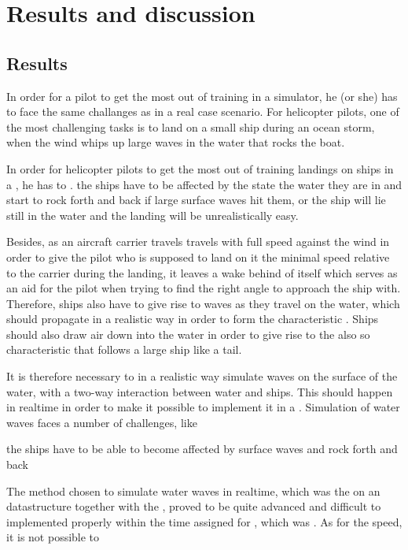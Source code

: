 \part{Results and discussion}

\chapter{Results}

In order for a pilot to get the most out of training in a simulator, he (or she) has to face the same challanges as in a real case scenario. For helicopter pilots, one of the most challenging tasks is to land on a small ship during an ocean storm, when the wind whips up large waves in the water that rocks the boat.

In order for helicopter pilots to get the most out of training landings on ships in a , he has to . the ships have to be affected by the state the water they are in and start to rock forth and back if large surface waves hit them, or the ship will lie still in the water and the landing will be unrealistically easy.

Besides, as an aircraft carrier travels travels with full speed against the wind in order to give the pilot who is supposed to land on it the minimal speed relative to the carrier during the landing, it leaves a wake behind of itself which serves as an aid for the pilot when trying to find the right angle to approach the ship with. Therefore, ships also have to give rise to waves as they travel on the water, which should propagate in a realistic way in order to form the characteristic . Ships should also draw air down into the water in order to give rise to the also so characteristic \backwash that follows a large ship like a tail.

It is therefore necessary to in a realistic way simulate waves on the surface of the water, with a two-way interaction between water and ships. This should happen in realtime in order to make it possible to implement it in a . Simulation of water waves faces a number of challenges, like 

the ships have to be able to become affected by surface waves and rock forth and back 

The method chosen to simulate water waves in realtime, which was the \FVM on an \octree datastructure together with the \VOF, proved to be quite advanced and difficult to implemented properly within the time assigned for \thismasterthesiswork, which was \masterthesisworktime. As for the speed, it is not possible to 

